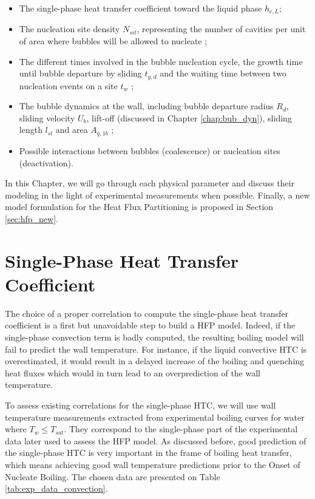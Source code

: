 \begin{itemize}
\item The single-phase heat transfer coefficient toward the liquid phase $h_{c,L}$;
\item The nucleation site density $N_{sit}$, representing the number of cavities per unit of area where bubbles will be allowed to nucleate ;
\item The different times involved in the bubble nucleation cycle, \ie the growth time until bubble departure by sliding $t_{g,d}$ and the waiting time between two nucleation events on a site $t_{w}$ ;
\item The bubble dynamics at the wall, including bubble departure radius $R_{d}$, sliding velocity $U_{b}$, lift-off (discussed in Chapter \ref{chap:bub_dyn}), sliding length $l_{sl}$ and area $A_{q,1b}$ ;
\item Possible interactions between bubbles (coalescence) or nucleation sites (deactivation).
\end{itemize}

In this Chapter, we will go through each physical parameter and discuss their modeling in the light of experimental measurements when possible. Finally, a new model formulation for the Heat Flux Partitioning is proposed in Section \ref{sec:hfp_new}.



\section{Single-Phase Heat Transfer Coefficient}
\label{sec:single_phase_HTC}

The choice of a proper correlation to compute the single-phase heat transfer coefficient is a first but unavoidable step to build a HFP model. Indeed, if the single-phase convection term is badly computed, the resulting boiling model will fail to predict the wall temperature. For instance, if the liquid convective HTC is overestimated, it would result in a delayed increase of the boiling and quenching heat fluxes which would in turn lead to an overprediction of the wall temperature.

\npar
To assess existing correlations for the single-phase HTC, we will use wall temperature measurements extracted from experimental boiling curves for water where $T_{w}\leq T_{sat}$. They correspond to the single-phase part of the experimental data later used to assess the HFP model. As discussed before, good prediction of the single-phase HTC is very important in the frame of boiling heat transfer, which means achieving good wall temperature predictions prior to the Onset of Nucleate Boiling. The chosen data are presented on Table \ref{tab:exp_data_convection}.


